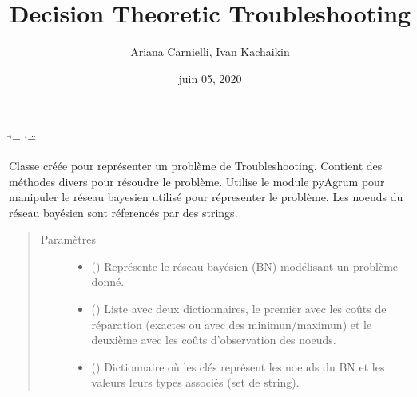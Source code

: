 \documentclass[letterpaper,10pt,french]{sphinxmanual}
\title{Decision Theoretic Troubleshooting}
\date{juin 05, 2020}
\author{Ariana Carnielli, Ivan Kachaikin}
\begin{document}
\ifdefined\shorthandoff
  \ifnum\catcode`\=\string=\active\shorthandoff{=}\fi
  \ifnum\catcode`\"=\active{}\fi
\fi

\pagestyle{empty}
\sphinxmaketitle
\pagestyle{plain}
\sphinxtableofcontents
\pagestyle{normal}
\label{\detokenize{index::doc}}

\label{\detokenize{index:module-DecisionTheoreticTroubleshooting}}

\begin{fulllineitems}
\label{\detokenize{index:DecisionTheoreticTroubleshooting.TroubleShootingProblem}}
Classe créée pour représenter un problème de Troubleshooting.
Contient des méthodes divers pour résoudre le problème.
Utilise le module pyAgrum pour manipuler le réseau bayesien utilisé pour
répresenter le problème.
Les noeuds du réseau bayésien sont réferencés par des strings.
\begin{quote}\begin{description}
\item[{Paramètres}] \leavevmode\begin{itemize}
\item {} 
 () \textendash{} Représente le réseau bayésien (BN) modélisant un problème donné.

\item {} 
 (\sphinxstyleliteralemphasis{\sphinxupquote{(}}\sphinxstyleliteralemphasis{\sphinxupquote{)}}) \textendash{} Liste avec deux dictionnaires, le premier avec les coûts de
réparation (exactes ou avec des minimun/maximun) et le deuxième
avec les coûts d’observation des noeuds.

\item {} 
 () \textendash{} Dictionnaire où les clés représent les noeuds du BN
et les valeurs leurs types associés (set de string).


\end{itemize}
\end{description}
\end{quote}
\end{fulllineitems}
\end{document}
